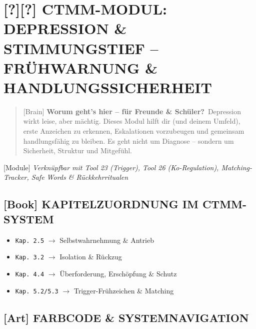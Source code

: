 \hypertarget{ctmm-modul-depression-stimmungstief-fruxfchwarnung-handlungssicherheit}{%
\section{[?][?] CTMM-MODUL: DEPRESSION \& STIMMUNGSTIEF -- FRÜHWARNUNG \& HANDLUNGSSICHERHEIT}\label{ctmm-modul-depression-stimmungstief-fruxfchwarnung-handlungssicherheit}}

\begin{quote}
[Brain] \textbf{Worum geht's hier -- für Freunde \& Schüler?}\
Depression wirkt leise, aber mächtig. Dieses Modul hilft dir (und deinem Umfeld), erste Anzeichen zu erkennen, Eskalationen vorzubeugen und gemeinsam handlungsfähig zu bleiben. Es geht nicht um Diagnose -- sondern um Sicherheit, Struktur und Mitgefühl.
\end{quote}

[Module] \emph{Verknüpfbar mit Tool 23 (Trigger), Tool 26 (Ko-Regulation), Matching-Tracker, Safe Words \& Rückkehrritualen}

\hypertarget{kapitelzuordnung-im-ctmm-system}{%
\subsection{[Book] KAPITELZUORDNUNG IM CTMM-SYSTEM}\label{kapitelzuordnung-im-ctmm-system}}

\begin{itemize}
\tightlist
\item
  \texttt{Kap.\ 2.5} $\rightarrow$ Selbstwahrnehmung \& Antrieb
\item
  \texttt{Kap.\ 3.2} $\rightarrow$ Isolation \& Rückzug
\item
  \texttt{Kap.\ 4.4} $\rightarrow$ Überforderung, Erschöpfung \& Schutz
\item
  \texttt{Kap.\ 5.2/5.3} $\rightarrow$ Trigger-Frühzeichen \& Matching
\end{itemize}

\hypertarget{farbcode-systemnavigation}{%
\subsection{[Art] FARBCODE \& SYSTEMNAVIGATION}\label{farbcode-systemnavigation}}

